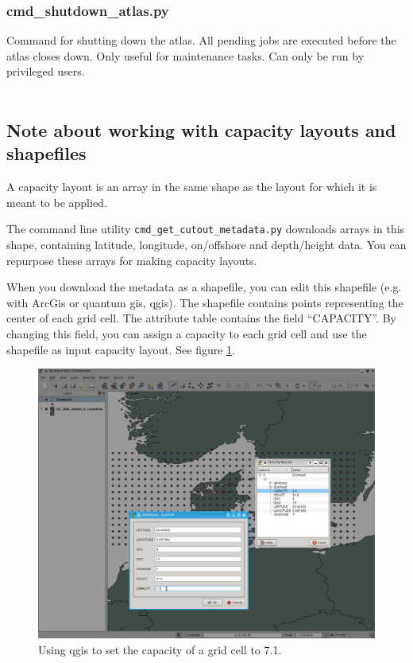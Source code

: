 \documentclass[a4paper,10pt]{article}
\begin{document}
\subsubsection{cmd\_shutdown\_atlas.py} Command for shutting down the atlas. All pending jobs are executed before the atlas closes down. Only useful for maintenance tasks. Can only be run by privileged users.
\ \\ \ \\ \cprotect{}

\subsection{Note about working with capacity layouts and shapefiles}

A capacity layout is an array in the same shape as the layout for
which it is meant to be applied.

The command line utility \verb+cmd_get_cutout_metadata.py+ downloads
arrays in this shape, containing latitude, longitude, on/offshore and
depth/height data. You can repurpose these arrays for making
capacity layouts.

When you download the metadata as a shapefile, you can edit
this shapefile (e.g. with ArcGis or quantum gis, qgis).
The shapefile contains points representing the center of each grid cell.
The attribute table contains the field ``CAPACITY''.
By changing this field, you can assign a capacity to each grid cell
and use the shapefile as input capacity layout. See figure \ref{fig:qgis}.

\begin{figure}[h]
\begin{center}
\includegraphics[width=\textwidth]{qgis.png}
\end{center}
\caption{Using qgis to set the capacity of a grid cell to 7.1.}
\label{fig:qgis}
\end{figure}
\end{document}
